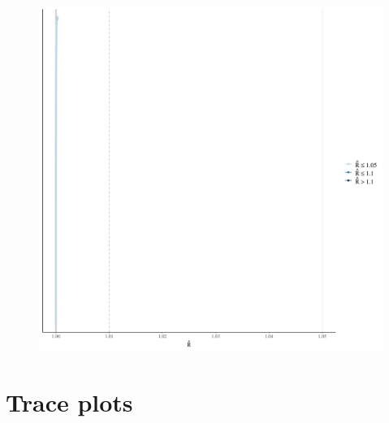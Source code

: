 \documentclass[
]{report}
\begin{document}
\begin{figure}

{\centering \includegraphics[width=1\textwidth,height=\textheight]{diagnostic_plots_files/figure-pdf/unnamed-chunk-7-1.pdf}

}

\end{figure}

\hypertarget{trace-plots-2}{%
\section{Trace plots}\label{trace-plots-2}}
\end{document}
